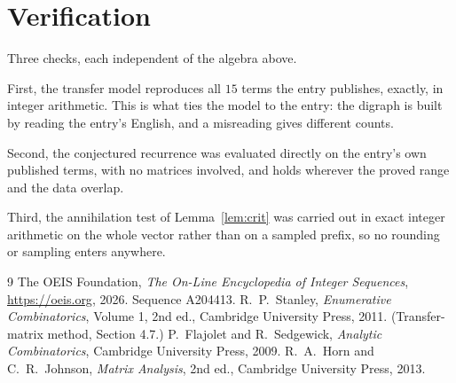 \documentclass[11pt,a4paper]{article}
\theoremstyle{plain}
\theoremstyle{definition}
\begin{document}
\section{Verification}

Three checks, each independent of the algebra above.

First, the transfer model reproduces all $15$ terms the entry publishes, exactly, in
integer arithmetic. This is what ties the model to the entry: the digraph is built by reading
the entry's English, and a misreading gives different counts.

Second, the conjectured recurrence was evaluated directly on the entry's own published terms,
with no matrices involved, and holds wherever the proved range and the data overlap.

Third, the annihilation test of Lemma~\ref{lem:crit} was carried out in exact integer
arithmetic on the whole vector rather than on a sampled prefix, so no rounding or sampling
enters anywhere.

\begin{thebibliography}{9}
 The OEIS Foundation, \emph{The On-Line Encyclopedia of Integer
Sequences}, \url{https://oeis.org}, 2026. Sequence A204413.
 R.~P.~Stanley, \emph{Enumerative Combinatorics}, Volume 1, 2nd ed.,
Cambridge University Press, 2011. (Transfer-matrix method, Section 4.7.)
 P.~Flajolet and R.~Sedgewick, \emph{Analytic Combinatorics}, Cambridge
University Press, 2009.
 R.~A.~Horn and C.~R.~Johnson, \emph{Matrix Analysis}, 2nd ed., Cambridge
University Press, 2013.
\end{thebibliography}
\end{document}
